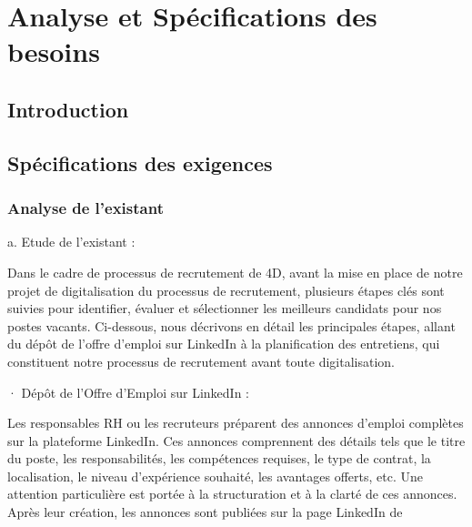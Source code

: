 

\chapter{Analyse et Spécifications des besoins}
\pagestyle{chapterstyle}


\newpage
\vspace{1cm}
\section{Introduction}

\section{Spécifications des exigences}

\subsection{Analyse de l'existant}

a. Etude de l'existant :

Dans le cadre de processus de recrutement de 4D, avant la mise en place de notre projet de digitalisation du processus de recrutement, plusieurs étapes clés sont suivies pour identifier, évaluer et sélectionner les meilleurs candidats pour nos postes vacants. Ci-dessous, nous décrivons en détail les principales étapes, allant du dépôt de l'offre d'emploi sur LinkedIn à la planification des entretiens, qui constituent notre processus de recrutement avant toute digitalisation.

· Dépôt de l'Offre d'Emploi sur LinkedIn :

Les responsables RH ou les recruteurs préparent des annonces d'emploi complètes sur la plateforme LinkedIn. Ces annonces comprennent des détails tels que le titre du poste, les responsabilités, les compétences requises, le type de contrat, la localisation, le niveau d'expérience souhaité, les avantages offerts, etc. Une attention particulière est portée à la structuration et à la clarté de ces annonces. Après leur création, les annonces sont publiées sur la page LinkedIn de

